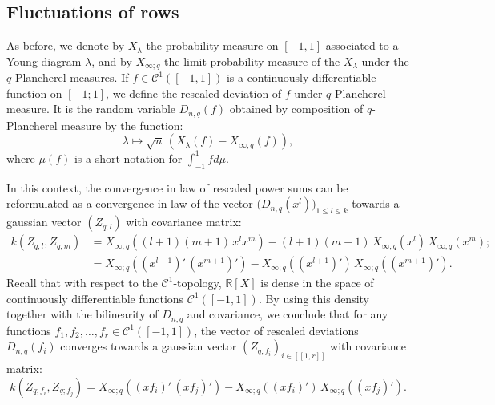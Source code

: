 \documentclass[10pt]{amsart}
\theoremstyle{remark}
\newcommand{\R}{\mathbb{R}}
\newcommand{\lle}{\left[\!\left[}
\newcommand{\rre}{\right]\!\right]}
\begin{document}
\subsection{Fluctuations of rows} \label{subsect:fluctuations_row}
 As before, we denote by $X_\lambda$ the probability measure on $[-1,1]$ associated to a Young diagram $\lambda$, and by $X_{\infty;q}$ the limit probability measure of the $X_{\lambda}$ under the $q$-Plancherel measures. If $f \in \mathscr{C}^1([-1,1])$ is a continuously differentiable function on $[-1;1]$, we define the rescaled deviation of $f$ under $q$-Plancherel measure. It is the random variable $D_{n,q}(f)$ obtained by composition of $q$-Plancherel measure by the function:
$$\lambda \mapsto \sqrt{n}\,\left(X_\lambda(f)-X_{\infty;q}(f)\right),$$
where $\mu(f)$ is a short notation for $\int_{-1}^1 f d\mu$.\bigskip

In this context, the convergence in law of rescaled power sums can be reformulated as a convergence in law of the vector 
$\big(D_{n,q}(x^l)\big)_{1 \leq l \leq k}$ towards a gaussian vector $(Z_{q;l})$ with covariance matrix: 
\begin{align*}k(Z_{q;l},Z_{q;m}) &= X_{\infty;q}((l+1)(m+1)\,x^{l}x^m)-(l+1)(m+1)\,X_{\infty;q}(x^{l})\,X_{\infty;q}(x^{m}) ;\\
&=X_{\infty;q}\left((x^{l+1})'\,(x^{m+1})'\right)-X_{\infty;q}\left((x^{l+1})'\right)\,X_{\infty;q}\left((x^{m+1})'\right).
\end{align*}
Recall that with respect to the $\mathscr{C}^1$-topology, $\R[X]$ is dense in the space of continuously differentiable functions $\mathscr{C}^1([-1,1])$.
By using this density together with the bilinearity of $D_{n,q}$ and covariance, we conclude that for any functions $f_1,f_2,\ldots,f_r \in \mathscr{C}^1([-1,1])$, the vector of rescaled deviations
$D_{n,q}(f_i)$ converges towards a gaussian vector $(Z_{q;f_i})_{i \in \lle 1,r\rre}$ with covariance matrix:
$$k(Z_{q;f_i},Z_{q;f_j}) = X_{\infty;q}\left((xf_i)'\,(xf_j)'\right)-X_{\infty;q}\left((xf_i)'\right)\,X_{\infty;q}\left((xf_j)'\right).$$
\end{document}
